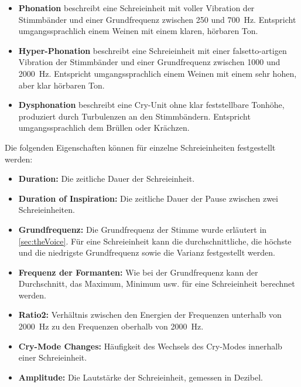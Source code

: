 \begin{itemize}
	\item \textbf{Phonation} beschreibt eine Schreieinheit mit \glqq voller Vibration der Stimmbänder\grqq{} und einer Grundfrequenz zwischen 250 und \SI{700}{\hertz}. Entspricht umgangssprachlich einem Weinen mit einem \glqq klaren, hörbaren Ton\grqq{}.
	\item \textbf{Hyper-Phonation} beschreibt eine Schreieinheit mit einer \glqq falsetto-artigen Vibration der Stimmbänder\grqq{} und einer Grundfrequenz zwischen 1000 und \SI{2000}{\hertz}. Entspricht umgangssprachlich einem Weinen mit einem \glqq sehr hohen, aber klar hörbaren Ton\grqq{}.
	\item \textbf{Dysphonation} beschreibt eine Cry-Unit ohne klar feststellbare Tonhöhe, produziert durch Turbulenzen an den Stimmbändern. Entspricht umgangssprachlich dem \glqq Brüllen oder Krächzen\grqq{}.\cite[S. 61 - 62]{cryModel}
\end{itemize}

Die folgenden Eigenschaften können für einzelne Schreieinheiten festgestellt werden:

\begin{itemize}
	\item \textbf{Duration:} Die zeitliche Dauer der Schreieinheit.
	\item \textbf{Duration of Inspiration: }Die zeitliche Dauer der Pause zwischen zwei Schreieinheiten.
	\item \textbf{Grundfrequenz:} Die Grundfrequenz der Stimme wurde erläutert in \autoref{sec:theVoice}. Für eine Schreieinheit kann die durchschnittliche, die höchste und die niedrigste Grundfrequenz sowie die Varianz festgestellt werden.
	\item \textbf{Frequenz der Formanten:} Wie bei der Grundfrequenz kann der Durchschnitt, das Maximum, Minimum usw. für eine Schreieinheit berechnet werden.
	\item \textbf{Ratio2: } Verhältnis zwischen den Energien der Frequenzen unterhalb von \SI{2000}{\hertz} zu den Frequenzen oberhalb von \SI{2000}{\hertz}.
	\item \textbf{Cry-Mode Changes:} Häufigkeit des Wechsels des Cry-Modes innerhalb einer Schreieinheit.
	\item \textbf{Amplitude:} Die Lautstärke der Schreieinheit, gemessen in Dezibel.\cite[S. 85]{parentalPerception} \cite[S. 156]{threeCryTypes}
\end{itemize}

